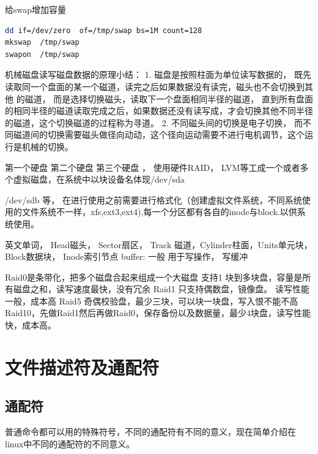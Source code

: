  给swap增加容量

\begin{lstlisting}[language=bash]
dd if=/dev/zero  of=/tmp/swap bs=1M count=128
mkswap  /tmp/swap
swapon  /tmp/swap
\end{lstlisting}


机械磁盘读写磁盘数据的原理小结：
1. 磁盘是按照柱面为单位读写数据的， 既先读取同一个盘面的某一个磁道，读完之后如果数据没有读完，磁头也不会切换到其他
的磁道， 而是选择切换磁头，读取下一个盘面相同半径的磁道， 直到所有盘面的相同半径的磁道读取完成之后，如果数据还没有读写成，才会切换其他不同半径的磁道，这个切换磁道的过程称为寻道。
2. 不同磁头间的切换是电子切换， 而不同磁道间的切换需要磁头做径向动动，这个径向运动需要不进行电机调节，这个运行是机械的切换。

第一个硬盘   第二个硬盘  第三个硬盘 ， 使用硬件RAID， LVM等工成一个或者多个虚拟磁盘，在系统中以块设备名体现/dev/sda

/dev/sdb  等， 在进行使用之前需要进行格式化（创建虚拟文件系统，不同系统使用的文件系统不一样，xfs,ext3,ext4),每一个分区都有各自的inode与block.以供系统使用。

英文单词， Head磁头， Sector扇区， Track 磁道，Cylinder柱面，Units单元块， Block数据块， Inode索引节点
buffer: 一般 用于写操作， 写缓冲

Raid0是条带化，把多个磁盘合起来组成一个大磁盘 支持1 块到多块盘，容量是所有磁盘之和，读写速度最快，没有冗余
Raid1 只支持偶数盘，镜像盘。 读写性能一般，成本高
Raid5 奇偶校验盘，最少三块，可以块一块盘，写入恨不能不高
Raid10，先做Raid1然后再做Raid0，保存备份以及数据量，最少4块盘，读写性能快，成本高。


\section{文件描述符及通配符}

\subsection{ 通配符}
  普通命令都可以用的特殊符号，不同的通配符有不同的意义，现在简单介绍在linux中不同的通配符的不同意义。
%

